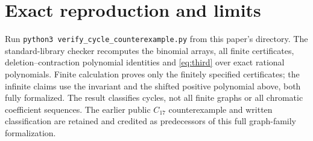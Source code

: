 \section{Exact reproduction and limits}
Run \texttt{python3 verify\_cycle\_counterexample.py} from this paper's
directory. The standard-library checker recomputes the binomial arrays,
all finite certificates, deletion--contraction polynomial identities and
\eqref{eq:third} over exact rational polynomials. Finite calculation proves
only the finitely specified certificates; the infinite claims use the
invariant and the shifted positive polynomial above, both fully formalized.
The result classifies cycles, not all finite graphs or all chromatic
coefficient sequences. The earlier public $C_{17}$ counterexample and
written classification are retained and credited as predecessors of this
full graph-family formalization.

